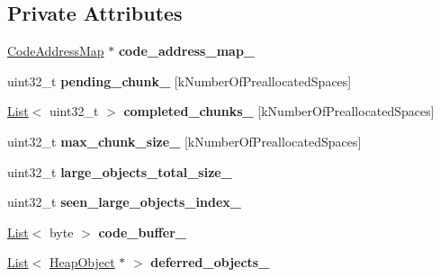 \subsection*{Private Attributes}
\begin{DoxyCompactItemize}
\item 
\hyperlink{classv8_1_1internal_1_1_code_address_map}{Code\+Address\+Map} $\ast$ {\bfseries code\+\_\+address\+\_\+map\+\_\+}\hypertarget{classv8_1_1internal_1_1_serializer_a73db10da79ce3ae61754ee3e17497612}{}\label{classv8_1_1internal_1_1_serializer_a73db10da79ce3ae61754ee3e17497612}

\item 
uint32\+\_\+t {\bfseries pending\+\_\+chunk\+\_\+} \mbox{[}k\+Number\+Of\+Preallocated\+Spaces\mbox{]}\hypertarget{classv8_1_1internal_1_1_serializer_a8d1549dab32e1dcf226db3b9f7caab30}{}\label{classv8_1_1internal_1_1_serializer_a8d1549dab32e1dcf226db3b9f7caab30}

\item 
\hyperlink{classv8_1_1internal_1_1_list}{List}$<$ uint32\+\_\+t $>$ {\bfseries completed\+\_\+chunks\+\_\+} \mbox{[}k\+Number\+Of\+Preallocated\+Spaces\mbox{]}\hypertarget{classv8_1_1internal_1_1_serializer_a34050fce67b5d274c02b9c9d11f61810}{}\label{classv8_1_1internal_1_1_serializer_a34050fce67b5d274c02b9c9d11f61810}

\item 
uint32\+\_\+t {\bfseries max\+\_\+chunk\+\_\+size\+\_\+} \mbox{[}k\+Number\+Of\+Preallocated\+Spaces\mbox{]}\hypertarget{classv8_1_1internal_1_1_serializer_a8a1e6361aece72f30ea4bc373b1e77ab}{}\label{classv8_1_1internal_1_1_serializer_a8a1e6361aece72f30ea4bc373b1e77ab}

\item 
uint32\+\_\+t {\bfseries large\+\_\+objects\+\_\+total\+\_\+size\+\_\+}\hypertarget{classv8_1_1internal_1_1_serializer_a63cdbd53dcff4d74f4de209f4f24846e}{}\label{classv8_1_1internal_1_1_serializer_a63cdbd53dcff4d74f4de209f4f24846e}

\item 
uint32\+\_\+t {\bfseries seen\+\_\+large\+\_\+objects\+\_\+index\+\_\+}\hypertarget{classv8_1_1internal_1_1_serializer_abe3162c486ad10b285d7683e0bb373f1}{}\label{classv8_1_1internal_1_1_serializer_abe3162c486ad10b285d7683e0bb373f1}

\item 
\hyperlink{classv8_1_1internal_1_1_list}{List}$<$ byte $>$ {\bfseries code\+\_\+buffer\+\_\+}\hypertarget{classv8_1_1internal_1_1_serializer_a5a37c6661940b03a3dceb50faf3cb6d1}{}\label{classv8_1_1internal_1_1_serializer_a5a37c6661940b03a3dceb50faf3cb6d1}

\item 
\hyperlink{classv8_1_1internal_1_1_list}{List}$<$ \hyperlink{classv8_1_1internal_1_1_heap_object}{Heap\+Object} $\ast$ $>$ {\bfseries deferred\+\_\+objects\+\_\+}\hypertarget{classv8_1_1internal_1_1_serializer_a47a2b47cd975ca57a213174a9589a590}{}\label{classv8_1_1internal_1_1_serializer_a47a2b47cd975ca57a213174a9589a590}

\end{DoxyCompactItemize}
